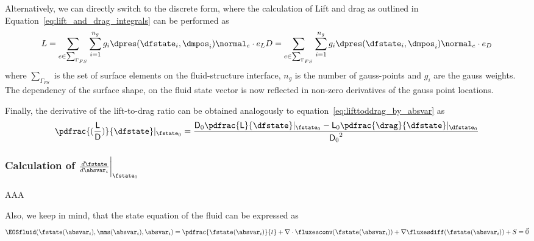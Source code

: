 \documentclass[../main.tex]{subfiles}
\begin{document}
Alternatively, we can directly switch to the discrete form, where the calculation of Lift and drag as outlined in Equation~\eqref{eq:lift_and_drag_integrals} can be performed as
\begin{align}\label{eq:discrete_lift_and_drag_formulas}
L=\sum_{e \in \sum_{\Gamma_{FS}}} \sum_{i=1}^{n_g} g_i \dpres(\dfstate_i,\dmpos_i) \normal_e \cdot e_L
D=\sum_{e \in \sum_{\Gamma_{FS}}} \sum_{i=1}^{n_g} g_i \dpres(\dfstate_i,\dmpos_i) \normal_e \cdot e_D
\end{align}
where $\sum_{\Gamma_{FS}}$ is the set of surface elements on the fluid-structure interface, $n_g$ is the number of gauss-points and $g_i$ are the gauss weights. The dependency of the surface shape, on the fluid state vector is now reflected in non-zero derivatives of the gauss point locations.

Finally, the derivative of the lift-to-drag ratio can be obtained analogously to equation~\eqref{eq:lifttoddrag_by_absvar} as
\begin{align}\label{eq:lifttodrag_by_dfstate}
\pdfrac{(\frac{\mathsf{L}}{\mathsf{D}})}{\dfstate}\rvert_{\fstate_0}=
\frac{\mathsf{D}_0 \pdfrac{\mathsf{L}}{\dfstate}\rvert_{\fstate_0} - \mathsf{L}_0 \pdfrac{\drag}{\dfstate}\rvert_{\dfstate_0} }{{\mathsf{D}_0}^2}
\end{align}


\subsubsection{Calculation of $\DfstateBYabsvarI\bigg\rvert_{\fstate_0}$}
AAA



Also, we keep in mind, that the state equation of the fluid can be expressed as
\begin{align}
\EOSfluid(\fstate(\absvar_i),\mms(\absvar_i),\absvar_i)=
\pdfrac{\fstate(\absvar_i)}{t}+\nabla\cdot\fluxesconv(\fstate(\absvar_i))+\nabla\fluxesdiff(\fstate(\absvar_i))+S=
\vec{0}
\end{align}
\end{document}
